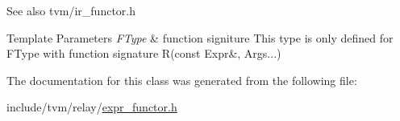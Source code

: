 \begin{DoxySeeAlso}{See also}
tvm/ir\+\_\+functor.\+h
\end{DoxySeeAlso}

\begin{DoxyTemplParams}{Template Parameters}
{\em F\+Type} & function signiture This type is only defined for F\+Type with function signature R(const Expr\&, Args...) \\
\hline
\end{DoxyTemplParams}


The documentation for this class was generated from the following file\+:\begin{DoxyCompactItemize}
\item 
include/tvm/relay/\hyperlink{relay_2expr__functor_8h}{expr\+\_\+functor.\+h}\end{DoxyCompactItemize}
